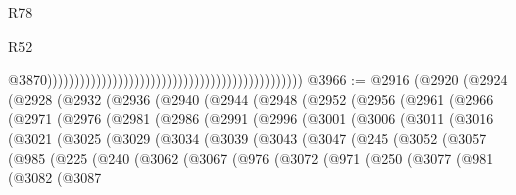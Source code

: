 \begin{lexlean}{R78}
\begin{lexlean}{R52}
\begin{coremodule}
{{{{{{{{{{{{{{{{{{{{{{{{{{{{{{{{{{{{{{{{{{{{{{{{{{{{{{{{{{{{{{{{{{{{{{{{{{{{{{{{{{{{{{{{{{{{{{{{{{{{{{{{{{{{{{{{{{{{{{{{{{{{{{{{{{{{{{{{{{{{{{{{{{{{{{{{{{{{{{{{{{{{{{{{{{{{{{{{{{{{{{{{{{{{{{{{{{{{{{                                                                                                  @3870)))))))))))))))))))))))))))))))))))))))))))))))
@3966 := @2916
    (@2920
      (@2924
        (@2928
          (@2932
            (@2936
              (@2940
                (@2944
                  (@2948
                    (@2952
                      (@2956
                        (@2961
                          (@2966
                            (@2971
                              (@2976
                                (@2981
                                  (@2986
                                    (@2991
                                      (@2996
                                        (@3001
                                          (@3006
                                            (@3011
                                              (@3016
                                                (@3021
                                                  (@3025
                                                    (@3029
                                                      (@3034
                                                        (@3039
                                                          (@3043
                                                            (@3047
                                                              (@245
                                                                (@3052
                                                                  (@3057
                                                                    (@985
                                                                      (@225
                                                                        (@240
                                                                          (@3062
                                                                            (@3067
                                                                              (@976
                                                                                (@3072
                                                                                  (@971
                                                                                    (@250
                                                                                      (@3077
                                                                                        (@981
                                                                                          (@3082
                                                                                            (@3087
}}}}}}}}}}}}}}}}}}}}}}}}}}}}}}}}}}}}}}}}}}}}}}}}}}}}}}}}}}}}}}}}}}}}}}}}}}}}}}}}}}}}}}}}}}}}}}}}}}}}}}}}}}}}}}}}}}}}}}}}}}}}}}}}}}}}}}}}}}}}}}}}}}}}}}}}}}}}}}}}}}}}}}}}}}}}}}}}}}}}}}}}}}}}}}}}}}}}}}
\end{coremodule}
\end{lexlean}
\end{lexlean}
